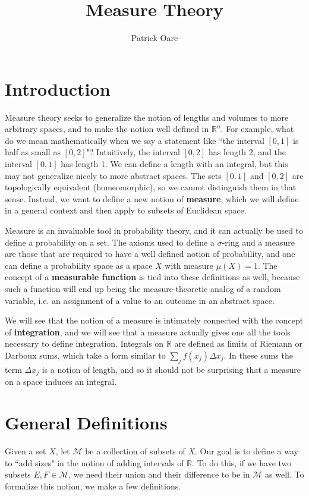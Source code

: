 \documentclass[11pt, oneside]{amsart}   	%
\title{Measure Theory}
\author{Patrick Oare}
\date{}							%
\theoremstyle{definition}
\begin{document}
\maketitle

\section*{Introduction}

Measure theory seeks to generalize the notion of lengths and volumes to more arbitrary spaces, and to make the notion well defined 
in $\mathbb R^n$. For example, what do we mean mathematically when we say a statement like ``the interval $[0, 1]$ is half as small 
as $[0, 2]$"? Intuitively, the interval $[0, 2]$ has length 2, and the interval $[0, 1]$ has length 1. We can define a length with an 
integral, but this may not generalize nicely to more abstract spaces. The sets $[0, 1]$ and $[0, 2]$ are topologically equivalent 
(homeomorphic), so we cannot distinguish them in that sense. Instead, we want to define a new notion of \textbf{measure}, which we 
will define in a general context and then apply to subsets of Euclidean space.

Measure is an invaluable tool in probability theory, and it can actually be used to define a probability on a set. The axioms used 
to define a $\sigma$-ring and a measure are those that are required to have a well defined notion of probability, and one can 
define a probability space as a space $X$ with measure $\mu(X) = 1$. The concept of a \textbf{measurable function} is tied 
into these definitions as well, because such a function will end up being the measure-theoretic analog of a random variable, i.e. 
an assignment of a value to an outcome in an abstract space.

We will see that the notion of a measure is intimately connected with the concept of \textbf{integration}, and we will see that a 
measure actually gives one all the tools necessary to define integration. Integrals on $\mathbb R$ are defined as limits of Riemann or 
Darboux sums, which take a form similar to $\sum_j f(x_j)\Delta x_j$. In these sums the term $\Delta x_j$ is a notion of length, and so 
it should not be surprising that a measure on a space induces an integral.

\section{General Definitions}

	Given a set $X$, let $\mathcal M$ be a collection of subsets of $X$. Our goal is to define a way to ``add sizes" in the 
	notion of adding intervals of $\mathbb R$. To do this, if we have two subsets $E, F\in\mathcal M$, we need their union and 
	their difference to be in $\mathcal M$ as well. To formalize this notion, we make a few definitions.
	
\end{document}

